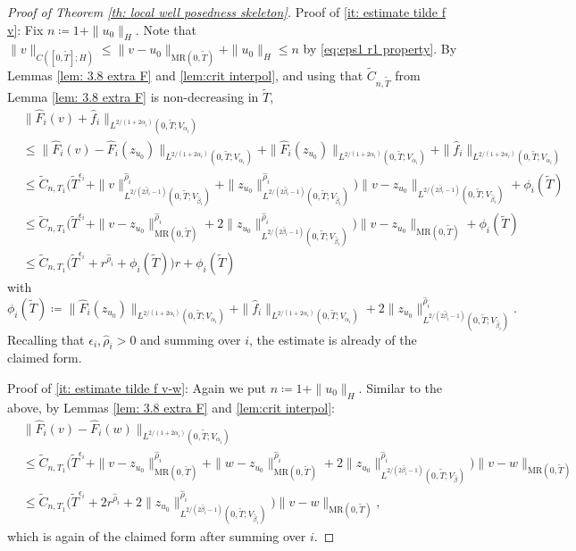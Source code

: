 \documentclass{amsart}
\renewcommand{\MR}{\mathrm{MR}}
\newcommand{\<}{\langle}
\newcommand{\?}{\rangle}
\newcommand{\ceqq}{\coloneqq}
\theoremstyle{plain}
\theoremstyle{remark}
\theoremstyle{plain}
\numberwithin{equation}{section}
\begin{document}
\begin{proof}[Proof of Theorem \ref{th: local well posedness skeleton}]
Proof of \ref{it: estimate tilde f v}: Fix $n\ceqq 1+\|u_0\|_H$. 
Note that $\|v\|_{C([0,\tilde{T}];H)}\leq \|v-{u_0}\|_{\MR(0,\tilde{T})}+\|u_0\|_H\leq  n$ by \eqref{eq:eps1 r1 property}. 
By Lemmas \ref{lem: 3.8 extra F} and \ref{lem:crit interpol}, and using that $\tilde{C}_{n,\tilde{T}}$ from Lemma \ref{lem: 3.8 extra F} is non-decreasing in $\tilde{T}$,  
\begin{align*}
 & \| \hat{F}_i(v)+\hat{f}_i\|_{L^{2/(1+2\alpha_i)}(0,\tilde{T};V_{\alpha_i})}\\
 &\leq \|\hat{F}_i(v)-\hat{F}_i(z_{u_0})\|_{L^{2/(1+2\alpha_i)}(0,\tilde{T};V_{\alpha_i})}+\|\hat{F}_i(z_{u_0}) \|_{L^{2/(1+2\alpha_i)}(0,\tilde{T};V_{\alpha_i})}+\|\hat{f}_i\|_{L^{2/(1+2\alpha_i)}(0,\tilde{T};V_{\alpha_i})}\\ 
&\leq \tilde{C}_{n,T_1} \Big(\tilde{T}^{\epsilon_i}+\|v\|_{L^{{2}/({2\hat{\beta}_i-1})}(0,\tilde{T};V_{\hat{\beta}_i})}^{\hat{\rho}_i}+\|z_{u_0}\|_{L^{{2}/({2\hat{\beta}_i-1})}(0,\tilde{T};V_{\hat{\beta}_i})}^{ \hat{\rho}_i}\Big)\|v-z_{u_0}\|_{ L^{{2}/({2\hat{\beta}_i-1})}(0,\tilde{T};V_{\hat{\beta}_i})}+\phi_i(\tilde{T})\\
&\leq \tilde{C}_{n,T_1} \Big(\tilde{T}^{\epsilon_i}+\|v-z_{u_0}\|_{\MR(0,\tilde{T})}^{\hat{\rho}_i}+2\|z_{u_0}\|_{L^{{2}/({2\hat{\beta}_i-1})}(0,\tilde{T};V_{\hat{\beta}_i})}^{ \hat{\rho}_i}\Big)\|v-z_{u_0}\|_{\MR(0,\tilde{T})}+\phi_i(\tilde{T})\\ 
  &\leq \tilde{C}_{n,T_1} \Big(\tilde{T}^{\epsilon_i}+ r^{\hat{\rho}_i} +\phi_i(\tilde{T})\Big) r+\phi_i(\tilde{T})
\end{align*} 
with
$
\phi_i(\tilde{T})\ceqq \| \hat{F}_i(z_{u_0}) \|_{L^{2/(1+2\alpha_i)}(0,\tilde{T};V_{\alpha_i})}+\|\hat{f}_i\|_{L^{2/(1+2\alpha_i)}(0,\tilde{T};V_{\alpha_i})}+2\|z_{u_0}\|_{L^{{2}/({2\hat{\beta}_i-1})}(0,\tilde{T};V_{\hat{\beta}_i})}^{ \hat{\rho}_i}.
$ 
Recalling that $\epsilon_i,\hat{\rho}_i>0$ and summing over $i$, the estimate is already of the claimed form. 

Proof of \ref{it: estimate tilde f v-w}: Again we put $n\ceqq 1+\|u_0\|_H$. Similar to the above, by Lemmas \ref{lem: 3.8 extra F} and \ref{lem:crit interpol}:
\begin{align*} 
&\|\hat{F}_i(v)-\hat{F}_i(w)\|_{L^{2/(1+2\alpha_i)}(0,\tilde{T};V_{\alpha_i})} \\
&\leq \tilde{C}_{n,T_1} \Big(\tilde{T}^{\epsilon_i}+\|v-z_{u_0}\|_{\MR(0,\tilde{T})}^{ \hat{\rho}_i}+\|w-z_{u_0}\|_{\MR(0,\tilde{T})}^{ \hat{\rho}_i}+2\|z_{u_0}\|_{L^{{2}/({2\hat{\beta}_i-1})}(0,\tilde{T};V_{\hat{\beta}})}^{\hat{\rho}_i}\Big)\|v-w\|_{\MR(0,\tilde{T})}\\
&\leq \tilde{C}_{n,T_1} \Big(\tilde{T}^{\epsilon_i}+2r^{ \hat{\rho}_i}+2\|z_{u_0}\|_{L^{{2}/({2\hat{\beta}_i-1})}(0,\tilde{T};V_{\hat{\beta}_i})}^{\hat{\rho}_i}\Big)\|v-w\|_{\MR(0,\tilde{T})},
\end{align*}
which is again of the claimed form after summing over $i$. 


\end{proof}
\end{document}
